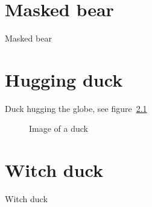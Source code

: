 \chapter{Masked bear}

Masked bear

\tagstructend %

\cleardoublepage


\chapter{Hugging duck}

Duck hugging the globe, see figure~\ref{fig:duck}

\begin{figure}
\caption{Image of a duck\label{fig:duck}}
\end{figure}


\chapter{Witch duck}

Witch duck

\tagstructend 
